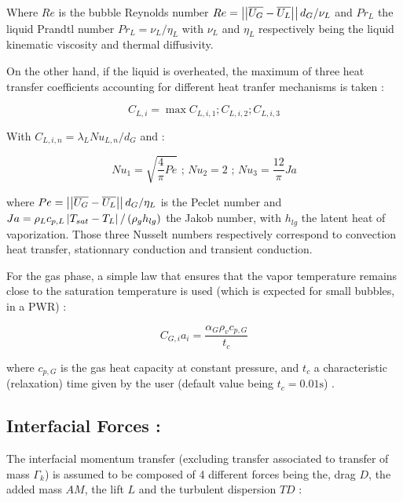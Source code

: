 Where $Re$ is the bubble Reynolds number $Re=\left|\left|{\overline{U_{G}}-\overline{U_{L}}}\right|\right|d_{G}/\nu_{L}$ and $Pr_{L}$ the liquid Prandtl number $Pr_{L}=\nu_{L}/\eta_{L}$ with $\nu_{L}$ and $\eta_{L}$ respectively being the liquid kinematic viscosity and thermal diffusivity.

On the other hand, if the liquid is overheated, the maximum of three heat transfer coefficients accounting for different heat tranfer mechanisms is taken \cite{berne1983}:

\begin{equation}
\label{eq:superheated_HT}
C_{L,i}=\max{C_{L,i,1} ; C_{L,i,2} ; C_{L,i,3}}
\end{equation}

With $C_{L,i,n}=\lambda_{L}Nu_{L,n}/d_{G}$ and :

\begin{equation}
\label{eq:nusselt}
Nu_{1}=\sqrt{\frac{4}{\pi}Pe}\text { ; } Nu_{2}=2 \text{ ; } Nu_{3}=\frac{12}{\pi} Ja
\end{equation}


where $Pe=\left|\left|{ \overline{U_{G}}-\overline{U_{L}} }\right|\right|d_{G}/\eta_{L}$ is the Peclet number and $Ja=\rho_{L}c_{p,L}\left| T_{sat}-T_{L} \right|/\left( \rho_{g} h_{lg} \right)$ the Jakob number, with $h_{lg}$ the latent heat of vaporization. Those three Nusselt numbers respectively correspond to convection heat transfer, stationnary conduction and transient conduction.


For the gas phase, a simple law that ensures that the vapor temperature remains close to the saturation temperature is used (which is expected for small bubbles, \eg in a PWR) :

\begin{equation}
\label{eq:gas_relaxation}
C_{G,i}a_{i}=\frac{\alpha_{G}\rho_{v}c_{p,G}}{t_{c}}
\end{equation}

where $c_{p,G}$ is the gas heat capacity at constant pressure, and $t_{c}$ a characteristic (relaxation) time given by the user (default value being $t_{c}=0.01\text{s}$) .

\subsection{Interfacial Forces :}

The interfacial momentum transfer (excluding transfer associated to transfer of mass $\Gamma_{k}$) is assumed to be composed of 4 different forces being the, drag $D$, the added mass $AM$, the lift $L$ and the turbulent dispersion $TD$ :

